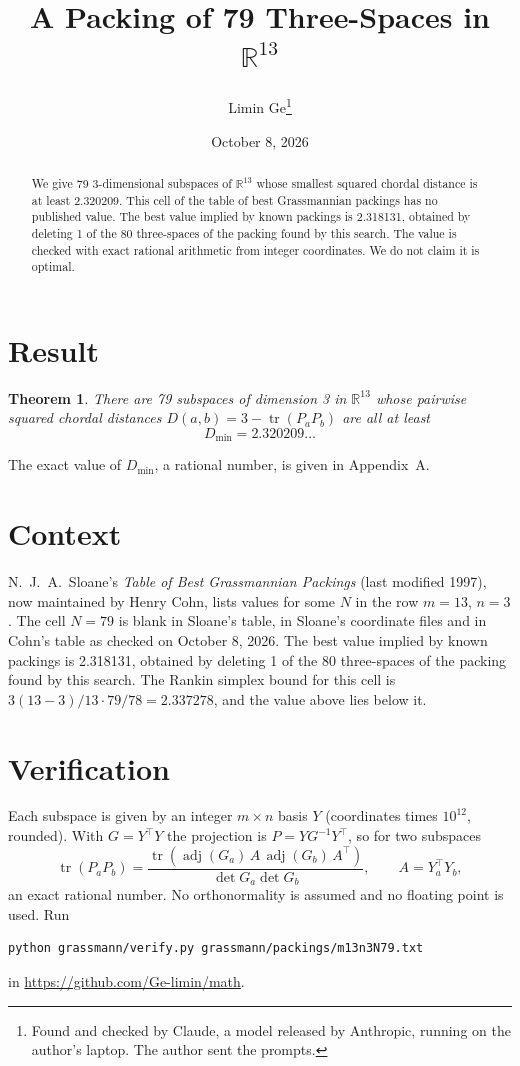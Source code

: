 \documentclass[11pt,a4paper]{article}
\title{A Packing of 79 Three-Spaces in $\mathbb{R}^{13}$}
\author{Limin Ge\thanks{Found and checked by Claude, a model released by Anthropic, running on the author's laptop. The author sent the prompts.}}
\date{October 8, 2026}
\newtheorem*{theorem}{Theorem}
\begin{document}
\maketitle
\begin{abstract}
We give 79 3-dimensional subspaces of $\mathbb{R}^{13}$ whose smallest squared chordal distance is at least 2.320209. This cell of the table of best Grassmannian packings has no published value. The best value implied by known packings is 2.318131, obtained by deleting 1 of the 80 three-spaces of the packing found by this search. The value is checked with exact rational arithmetic from integer coordinates. We do not claim it is optimal.
\end{abstract}

\section{Result}
\begin{theorem}
There are 79 subspaces of dimension 3 in $\mathbb{R}^{13}$ whose pairwise squared chordal distances $D(a,b) = 3 - \operatorname{tr}(P_aP_b)$ are all at least
\[ D_{\min} = 2.320209\ldots \]
\end{theorem}
The exact value of $D_{\min}$, a rational number, is given in Appendix~A.


\section{Context}
N.~J.~A.~Sloane's \emph{Table of Best Grassmannian Packings} (last modified 1997), now maintained by Henry Cohn, lists values for some $N$ in the row $m=13$, $n=3$. The cell $N=79$ is blank in Sloane's table, in Sloane's coordinate files and in Cohn's table as checked on October 8, 2026. The best value implied by known packings is 2.318131, obtained by deleting 1 of the 80 three-spaces of the packing found by this search. The Rankin simplex bound for this cell is $3(13-3)/13\cdot 79/78 = 2.337278$, and the value above lies below it.


\section{Verification}
Each subspace is given by an integer $m\times n$ basis $Y$ (coordinates times $10^{12}$, rounded). With $G=Y^\top Y$ the projection is $P=YG^{-1}Y^\top$, so for two subspaces
\[ \operatorname{tr}(P_aP_b)=\frac{\operatorname{tr}(\operatorname{adj}(G_a)\,A\,\operatorname{adj}(G_b)\,A^\top)}{\det G_a\det G_b},\qquad A=Y_a^\top Y_b, \]
an exact rational number. No orthonormality is assumed and no floating point is used. Run
\begin{verbatim}
python grassmann/verify.py grassmann/packings/m13n3N79.txt
\end{verbatim}
in \url{https://github.com/Ge-limin/math}.
\end{document}
